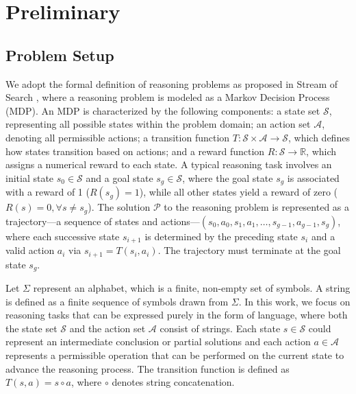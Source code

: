 \documentclass{article}
\theoremstyle{plain}
\theoremstyle{definition}
\theoremstyle{remark}
\begin{document}
\section{Preliminary}
\subsection{Problem Setup}
We adopt the formal definition of reasoning problems as proposed in Stream of Search \cite{sos}, where a reasoning problem is modeled as a Markov Decision Process (MDP). An MDP is characterized by the following components: a state set $\mathcal{S}$, representing all possible states within the problem domain; an action set $\mathcal{A}$, denoting all permissible actions; a transition function $T: \mathcal{S} \times \mathcal{A} \rightarrow \mathcal{S}$, which defines how states transition based on actions; and a reward function $R: \mathcal{S} \rightarrow \mathbb{R}$, which assigns a numerical reward to each state.
A typical reasoning task involves an initial state $s_0 \in \mathcal{S}$ and a goal state $s_g \in \mathcal{S}$, where the goal state $s_g$ is associated with a reward of 1 ($R(s_g) = 1$), while all other states yield a reward of zero ($R(s) = 0, \forall s \neq s_g$). The solution $\mathcal P$ to the reasoning problem is represented as a trajectory—a sequence of states and actions—$(s_0,a_0,s_1, a_1, \ldots, s_{g-1},a_{g-1},s_g)$, where each successive state $s_{i+1}$ is determined by the preceding state $s_i$ and a valid action $a_i$ via $s_{i+1} = T(s_i, a_i)$. The trajectory must terminate at the goal state $s_g$.

Let $\Sigma$ represent an alphabet, which is a finite, non-empty set of symbols.  A string is defined as a finite sequence of symbols drawn from $\Sigma$.  In this work, we focus on reasoning tasks that can be expressed purely in the form of language, where both the state set $\mathcal{S}$ and the action set $\mathcal{A}$ consist of strings.  Each state $s \in \mathcal{S}$ could represent an intermediate conclusion or partial solutions and each action $a \in \mathcal{A}$ represents a permissible operation that can be performed on the current state to advance the reasoning process. The transition function is defined as $T(s,a)=s\circ a$, where $\circ$ denotes string concatenation.
\end{document}

